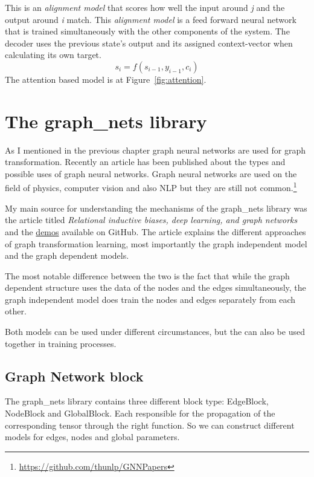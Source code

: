 This is an \textit{alignment model} that scores how well the input around \textit{j} and the output around \textit{i} match. This \textit{alignment model} is a feed forward neural network that is trained simultaneously with the other components of the system.
The decoder uses the previous state's output and its assigned context-vector when calculating its own target.
\[s_i = f(s_{i-1}, y_{i-1}, c_i)\]
The attention based model is at Figure~\ref{fig:attention}.


\section{The graph\_nets library}
As I mentioned in the previous chapter graph neural networks are used for graph transformation. Recently an article has been published about the types and possible uses of graph neural networks\cite{SurveyGNN}.  Graph neural networks are used on the field of physics\cite{PhysicsGNN}, computer vision\cite{CVGNN} and also NLP\cite{NLPGNN} but they are still not common.\footnote{\url{https://github.com/thunlp/GNNPapers}}

My main source for understanding the mechanisms of the graph\_nets library was the article titled \textit{Relational inductive biases, deep learning, and graph networks}\cite{GraphNet} and the \href{https://github.com/deepmind/graph_nets/tree/master/graph_nets/demos}{demos} available on GitHub.
The article explains the different approaches of graph transformation learning, most importantly the graph independent model and the graph dependent models.

The most notable difference between the two is the fact that while the graph dependent structure uses the data of the nodes and the edges simultaneously, the graph independent model does train the nodes and edges separately from each other.

Both models can be used under different circumstances, but the can also be used together in training processes.

\subsection{Graph Network block}

The graph\_nets library contains three different block type: EdgeBlock, NodeBlock and GlobalBlock. Each responsible for the propagation of the corresponding tensor through the right function. So we can construct different models for edges, nodes and global parameters.

